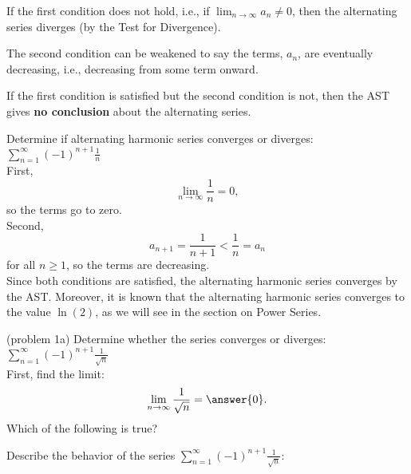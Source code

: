 \documentclass[handout]{ximera}
\begin{document}
\begin{remark} If the first condition does not hold, i.e., if 
$\displaystyle{\lim_{n\to\infty} a_n \neq 0}$, 
then the alternating series diverges (by the Test for Divergence).
\end{remark}

\begin{remark}
The second condition can be weakened to say the terms, $a_n$, are eventually decreasing, i.e., decreasing from some term onward.
\end{remark}

\begin{remark} 
If the first condition is satisfied but the second condition is not, then the AST gives \textbf{no conclusion} about the alternating series.
\end{remark}

\begin{example}[example 1] Determine if alternating harmonic series converges or diverges: 
$\displaystyle{\sum_{n=1}^\infty (-1)^{n+1} \frac{1}{n}}$\\ 
First, 
\[
\lim_{n\to\infty} \frac{1}{n} = 0,
\]
so the terms go to zero.\\
Second,
\[
a_{n+1} = \frac{1}{n+1} < \frac{1}{n} = a_n
\]
for all $n \geq 1$, so the terms are decreasing. \\
Since both conditions are satisfied, the alternating harmonic series converges by the AST.
Moreover, it is known that the alternating harmonic series converges to the 
value $\ln(2)$, as we will see in the section on Power Series.
\end{example}

\begin{problem}(problem 1a)
Determine whether the series converges or diverges: $\displaystyle{\sum_{n=1}^\infty (-1)^{n+1} \frac{1}{\sqrt n}}$\\
First, find the limit:
\[
\lim_{n\to\infty} \frac{1}{\sqrt n} = \answer{0}.
\]
Which of the following is true?
\begin{multipleChoice}
\end{multipleChoice}


Describe the behavior of the series $\displaystyle{\sum_{n=1}^\infty (-1)^{n+1} \frac{1}{\sqrt n}:}$
\begin{multipleChoice}
\end{multipleChoice}

\end{problem}
\end{document}
